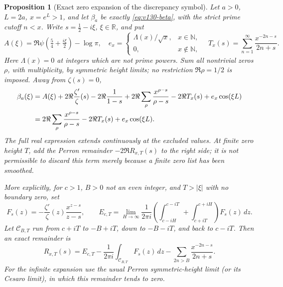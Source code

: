 \documentclass[11pt]{article}
\newtheorem{proposition}[theorem]{Proposition}
\theoremstyle{remark}
\begin{document}
\begin{proposition}[Exact zero expansion of the discrepancy symbol]
\label{prop:v146-beta-explicit}
Let $a>0$, $L=2a$, $x=e^L>1$, and let $\beta_a$ be exactly
\eqref{eq:v130-beta}, with the strict prime cutoff $n<x$. Write
$s=\tfrac12-i\xi$, $\xi\in\mathbb R$, and put
\[
 A(\xi)=\Re\psi(\tfrac54+\tfrac{i\xi}2)-\log\pi,
 \quad e_x=\begin{cases}\Lambda(x)/\sqrt{x},&x\in\mathbb N,\\0,&x\notin\mathbb N,\end{cases}
 \quad T_x(s)=\sum_{n=1}^\infty\frac{x^{-2n-s}}{2n+s}.
\]
Here $\Lambda(x)=0$ at integers which are not prime powers. Sum all
nontrivial zeros $\rho$, with multiplicity, by symmetric height limits;
no restriction $\Re\rho=1/2$ is imposed. Away from $\zeta(s)=0$,
\begin{align}
 \beta_a(\xi)={}&A(\xi)+2\Re\frac{\zeta'}\zeta(s)
       -2\Re\frac1{1-s}
       +2\Re\sum_\rho\frac{x^{\rho-s}}{\rho-s}
       -2\Re T_x(s)+e_x\cos(\xi L) \notag\\
 ={}&2\Re\sum_\rho\frac{x^{\rho-s}}{\rho-s}
       -2\Re T_x(s)+e_x\cos(\xi L).
 \label{eq:v146-beta-explicit}
\end{align}
The full real expression extends continuously at the excluded values.
At finite zero height $T$, add the Perron remainder $-2\Re R_{x,T}(s)$
to the right side; it is not permissible to discard this term merely
because a finite zero list has been smoothed.

More explicitly, for $c>1$, $B>0$ not an even integer, and $T>|\xi|$
with no boundary zero, set
\[
 F_s(z)=-\frac{\zeta'}\zeta(z)\frac{x^{z-s}}{z-s},\qquad
 E_{c,T}=\lim_{H\to\infty}\frac1{2\pi i}
 \left(\int_{c-iH}^{c-iT}+\int_{c+iT}^{c+iH}\right)F_s(z)\,dz.
\]
Let $\mathcal C_{B,T}$ run from $c+iT$ to $-B+iT$, down to
$-B-iT$, and back to $c-iT$. Then an exact remainder is
\begin{equation}\label{eq:v146-perron-remainder}
 R_{x,T}(s)=E_{c,T}-\frac1{2\pi i}\int_{\mathcal C_{B,T}}F_s(z)\,dz
       -\sum_{2n>B}\frac{x^{-2n-s}}{2n+s}.
\end{equation}
For the infinite expansion use the usual Perron symmetric-height
limit (or its Cesaro limit), in which this remainder tends to zero.
\end{proposition}
\end{document}
